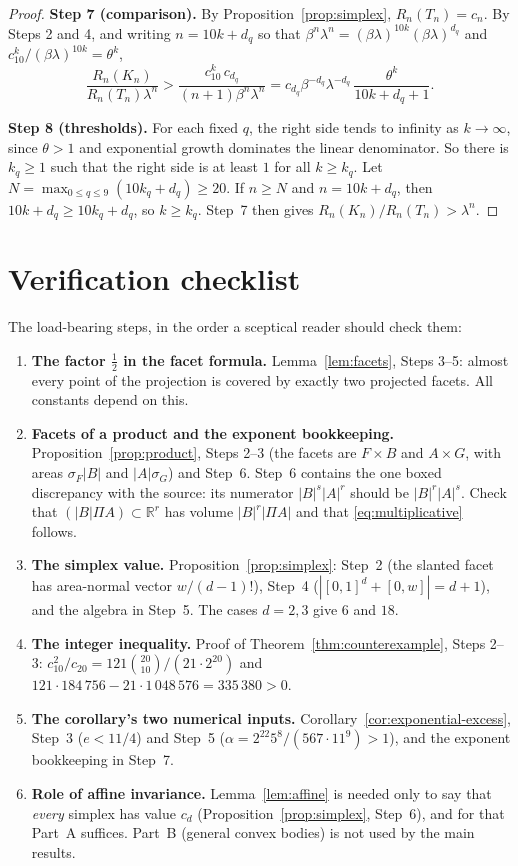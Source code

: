 \documentclass[11pt]{article}
\newcommand{\R}{\mathbb R}
\newcommand{\step}[1]{\smallskip\noindent\textbf{#1}}
\begin{document}
\begin{proof}
\step{Step 7 (comparison).} By Proposition~\ref{prop:simplex},
\(R_n(T_n)=c_n\). By Steps 2 and 4, and writing \(n=10k+d_q\) so that
\(\beta^n\lambda^n=(\beta\lambda)^{10k}(\beta\lambda)^{d_q}\) and
\(c_{10}^k/(\beta\lambda)^{10k}=\theta^k\),
\[
 \frac{R_n(K_n)}{R_n(T_n)\lambda^n}
 >\frac{c_{10}^k\,c_{d_q}}{(n+1)\beta^n\lambda^n}
 =c_{d_q}\beta^{-d_q}\lambda^{-d_q}\,
   \frac{\theta^k}{10k+d_q+1}.
\]

\step{Step 8 (thresholds).} For each fixed \(q\), the right side tends to
infinity as \(k\to\infty\), since \(\theta>1\) and exponential growth
dominates the linear denominator. So there is \(k_q\ge1\) such that the
right side is at least \(1\) for all \(k\ge k_q\). Let
\(N=\max_{0\le q\le9}(10k_q+d_q)\ge20\). If \(n\ge N\) and
\(n=10k+d_q\), then \(10k+d_q\ge10k_q+d_q\), so \(k\ge k_q\). Step~7 then
gives \(R_n(K_n)/R_n(T_n)>\lambda^n\).
\end{proof}

\section{Verification checklist}\label{sec:checklist}

The load-bearing steps, in the order a sceptical reader should check them:

\begin{enumerate}[leftmargin=2em,itemsep=3pt]
\item \textbf{The factor \(\tfrac12\) in the facet formula.}
Lemma~\ref{lem:facets}, Steps 3--5: almost every point of the projection
is covered by exactly two projected facets. All constants depend on this.
\item \textbf{Facets of a product and the exponent bookkeeping.}
Proposition~\ref{prop:product}, Steps 2--3 (the facets are \(F\times B\)
and \(A\times G\), with areas \(\sigma_F|B|\) and \(|A|\sigma_G\)) and
Step~6. Step~6 contains the one boxed discrepancy with the source: its
numerator \(|B|^s|A|^r\) should be \(|B|^r|A|^s\). Check that
\((|B|\Pi A)\subset\R^r\) has volume \(|B|^r|\Pi A|\) and that
\eqref{eq:multiplicative} follows.
\item \textbf{The simplex value.} Proposition~\ref{prop:simplex}: Step~2
(the slanted facet has area-normal vector \(w/(d-1)!\)), Step~4
(\(|[0,1]^d+[0,w]|=d+1\)), and the algebra in Step~5. The cases \(d=2,3\)
give \(6\) and \(18\).
\item \textbf{The integer inequality.} Proof of
Theorem~\ref{thm:counterexample}, Steps 2--3:
\(c_{10}^2/c_{20}=121\binom{20}{10}/(21\cdot2^{20})\) and
\(121\cdot184\,756-21\cdot1\,048\,576=335\,380>0\).
\item \textbf{The corollary's two numerical inputs.}
Corollary~\ref{cor:exponential-excess}, Step~3 (\(e<11/4\)) and Step~5
(\(\alpha=2^{22}5^8/(567\cdot11^9)>1\)), and the exponent bookkeeping in
Step~7.
\item \textbf{Role of affine invariance.} Lemma~\ref{lem:affine} is needed
only to say that \emph{every} simplex has value \(c_d\)
(Proposition~\ref{prop:simplex}, Step~6), and for that Part~A suffices.
Part~B (general convex bodies) is not used by the main results.
\end{enumerate}
\end{document}
